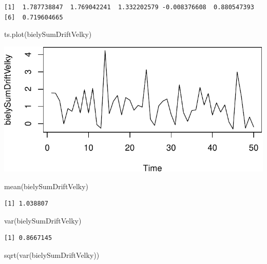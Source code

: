 \documentclass[
  letterpaper,
  DIV=11,
  numbers=noendperiod]{scrreprt}
\newenvironment{Shaded}{\begin{snugshade}}{\end{snugshade}}
\newcommand{\FunctionTok}[1]{\textcolor[rgb]{0.28,0.35,0.67}{#1}}
\newcommand{\NormalTok}[1]{\textcolor[rgb]{0.00,0.23,0.31}{#1}}
\begin{document}
\begin{verbatim}
[1]  1.787738847  1.769042241  1.332202579 -0.008376608  0.880547393
[6]  0.719604665
\end{verbatim}

\begin{Shaded}
\begin{Highlighting}[]
\FunctionTok{ts.plot}\NormalTok{(bielySumDriftVelky)}
\end{Highlighting}
\end{Shaded}

\includegraphics{prednaska3_NahodnaPrechadzkaStacionarita_files/figure-pdf/unnamed-chunk-11-3.pdf}

\begin{Shaded}
\begin{Highlighting}[]
\FunctionTok{mean}\NormalTok{(bielySumDriftVelky)}
\end{Highlighting}
\end{Shaded}

\begin{verbatim}
[1] 1.038807
\end{verbatim}

\begin{Shaded}
\begin{Highlighting}[]
\FunctionTok{var}\NormalTok{(bielySumDriftVelky)}
\end{Highlighting}
\end{Shaded}

\begin{verbatim}
[1] 0.8667145
\end{verbatim}

\begin{Shaded}
\begin{Highlighting}[]
\FunctionTok{sqrt}\NormalTok{(}\FunctionTok{var}\NormalTok{(bielySumDriftVelky))}
\end{Highlighting}
\end{Shaded}
\end{document}
